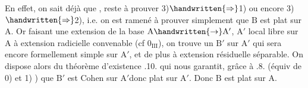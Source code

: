 En effet, on sait déjà que , reste à prouver  3)$\handwritten{\Rightarrow}$1)  ou encore 3)$\handwritten{\Rightarrow}$2), i.e. on est ramené à prouver simplement que $\mathrm B$ est plat sur $\mathrm A$. Or faisant une extension de la base $\mathrm A\handwritten{\to}\mathrm A'$, $\mathrm A'$ local libre  sur $\mathrm A$ à extension radicielle convenable (cf $0_{\mathrm{III}}$), on trouve un $\mathrm B'$  sur $\mathrm A'$ qui sera encore formellement simple sur $\mathrm A'$, et de plus à extension résiduelle  séparable\handwritten{$/^{\circ}$}. On dispose alors du théorème d'existence .10. qui nous garantit, grâce à .8. (équiv de 0) et 1) ) que $\mathrm B'$ est Cohen sur $\mathrm A'$donc plat sur $\mathrm A'$. Donc $\mathrm B$ est plat sur $\mathrm A$.

